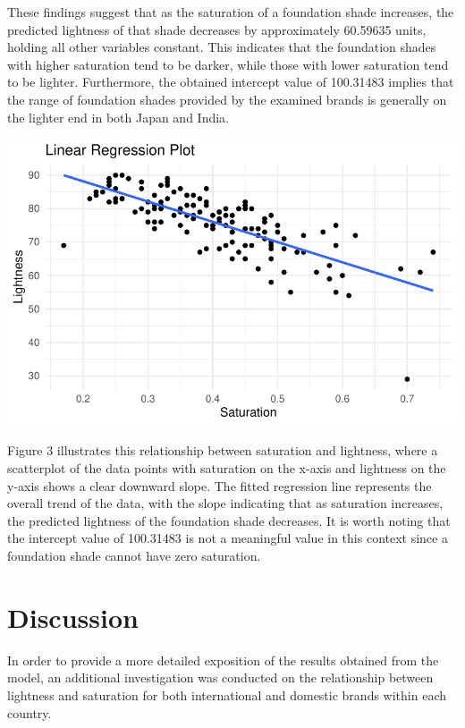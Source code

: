 \documentclass[
  letterpaper,
  DIV=11,
  numbers=noendperiod]{scrartcl}
\begin{document}
These findings suggest that as the saturation of a foundation shade
increases, the predicted lightness of that shade decreases by
approximately 60.59635 units, holding all other variables constant. This
indicates that the foundation shades with higher saturation tend to be
darker, while those with lower saturation tend to be lighter.
Furthermore, the obtained intercept value of 100.31483 implies that the
range of foundation shades provided by the examined brands is generally
on the lighter end in both Japan and India.

\includegraphics{paper_files/figure-pdf/unnamed-chunk-6-1.pdf}

Figure 3 illustrates this relationship between saturation and lightness,
where a scatterplot of the data points with saturation on the x-axis and
lightness on the y-axis shows a clear downward slope. The fitted
regression line represents the overall trend of the data, with the slope
indicating that as saturation increases, the predicted lightness of the
foundation shade decreases. It is worth noting that the intercept value
of 100.31483 is not a meaningful value in this context since a
foundation shade cannot have zero saturation.

\newpage

\hypertarget{discussion}{%
\section{Discussion}\label{discussion}}

In order to provide a more detailed exposition of the results obtained
from the model, an additional investigation was conducted on the
relationship between lightness and saturation for both international and
domestic brands within each country.
\end{document}
